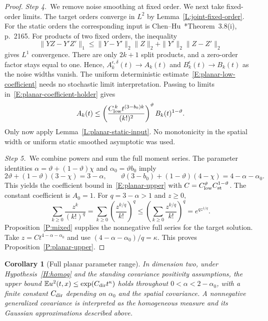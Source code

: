 \documentclass[12pt,oneside,openany]{book}
\numberwithin{equation}{section}
\newtheorem{corollary}[theorem]{Corollary}
\theoremstyle{nogostyle}
\theoremstyle{definition}
\newcommand{\E}{\mathbb{E}}
\begin{document}
\begin{proof}
  \medskip
  \noindent\textit{Step 4.~}We remove noise smoothing at fixed order.
  We next take fixed-order limits. The target orders converge in $L^2$ by
  Lemma~\ref{L:joint-fixed-order}. For the static orders the corresponding input
  is Chen--Hu~\cite{chen.hu:25:hyperbolic}*{Theorem~3.8(i), p.~2165}. For
  products of two fixed orders, the inequality
  \[
    \|YZ-Y'Z'\|_1
    \le\|Y-Y'\|_2\|Z\|_2+\|Y'\|_2\|Z-Z'\|_2
  \]
  gives $L^1$ convergence. There are only $2k+1$ split products, and a
  zero-order factor stays equal to one. Hence, $A_k^{\epsilon,\delta}(t) \to
  A_k(t)$ and $B_k^\epsilon(t) \to B_k(t)$ as the noise widths vanish. The
  uniform deterministic estimate~\eqref{E:planar-low-coefficient} needs no
  stochastic limit interpretation. Passing to limits
  in~\eqref{E:planar-coefficient-holder} gives
  \[
    A_k(t)\le
    \left(\frac{C_{\rm low}^{\,k}t^{(3-b_0)k}}{(k!)^2}\right)^\vartheta
    B_k(t)^{1-\vartheta}.
  \]
  Only now apply Lemma~\ref{L:planar-static-input}. No monotonicity in the
  spatial width or uniform static smoothed asymptotic was used.


  \medskip
  \noindent\textit{Step 5.~}We combine powers and sum the full moment series.
  The parameter identities $\alpha = \vartheta+(1-\vartheta)\chi$ and $\alpha_0
  = \vartheta b_0$ imply
  \[
    2\vartheta+(1-\vartheta)(3-\chi)=3-\alpha,\qquad
    \vartheta(3-b_0)+(1-\vartheta)(4-\chi)=4-\alpha-\alpha_0.
  \]
  This yields the coefficient bound in~\eqref{E:planar-upper} with $C = C_{\rm
  low}^\vartheta C_{\rm st}^{1-\vartheta}$. The constant coefficient is $A_0 =
  1$. For $q = 3-\alpha > 1$ and $z \ge 0$,
  \[
    \sum_{k\ge0}\frac{z^k}{(k!)^q}
    =\sum_{k\ge0}\left(\frac{z^{k/q}}{k!}\right)^q
    \le\left(\sum_{k\ge0}\frac{z^{k/q}}{k!}\right)^q
    =e^{qz^{1/q}}.
  \]
  Proposition~\ref{P:mixed} supplies the nonnegative full series for the target
  solution. Take $z = Ct^{4-\alpha-\alpha_0}$ and use $(4-\alpha-\alpha_0)/q =
  \kappa$. This proves Proposition~\ref{P:planar-upper}.
\end{proof}

\begin{corollary}[Full planar parameter range]\label{C:planar-range}
  In dimension two, under Hypothesis~\ref{H:homog} and the standing covariance
  positivity assumptions, the upper bound $\E u^2(t,x) \le \exp(C_{\rm dir}t^\kappa)$
  holds throughout $0 < \alpha < 2-\alpha_0$, with a finite constant $C_{\rm dir}$
  depending on $\alpha_0$ and the spatial covariance. A nonnegative generalized
  covariance is interpreted as the homogeneous measure and its Gaussian
  approximations described above.
\end{corollary}
\end{document}
